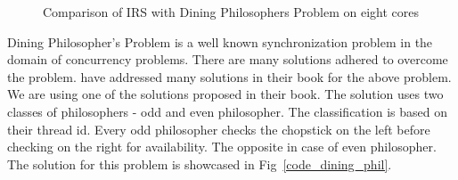 \begin{figure}[h]
     \centering
     \caption{Comparison of IRS with Dining Philosophers Problem on eight cores}
\end{figure}

Dining Philosopher's Problem is a well known synchronization problem in the domain of concurrency problems. 
There are many solutions adhered to overcome the problem. 
\citet{silberschatz2014operating} have addressed many solutions in their book for the above problem. 
We are using one of the solutions proposed in their book. 
The solution uses two classes of philosophers - odd and even philosopher. 
The classification is based on their thread id. 
Every odd philosopher checks the chopstick on the left before checking on the right for availability. 
The opposite in case of even philosopher. 
The solution for this problem is showcased in Fig~\ref{code_dining_phil}.

